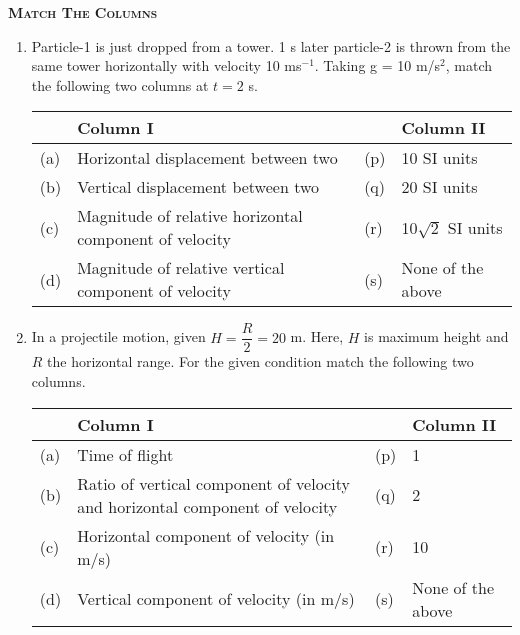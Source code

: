 \documentclass{article}
\renewcommand{\frac}[2]{\dfrac{#1}{#2}}
\begin{document}
\begin{center}
    \textsc{\textbf{Match The Columns}}
\end{center}


\begin{enumerate}
    \item Particle-1 is just dropped from a tower. 1 s later particle-2 is thrown from the same tower horizontally with velocity 10 ms$^{-1}$. Taking g = 10 m/s$^{2}$, match the following two columns at $t = 2$ s.
    \begin{center}
        \renewcommand{\arraystretch}{2}
        \begin{table}[h]
            \centering
            \begin{tabular}{p{0.25cm}p{8.5cm}|p{0.25cm}p{4.5cm}}
            \hline
            & Column I & & Column II \\
            \hline
            (a) & Horizontal displacement between two & (p) & 10 SI units \\
            (b) & Vertical displacement between two & (q) & 20 SI units \\
            (c) & Magnitude of relative horizontal component of velocity & (r) & 10$\sqrt{2}$ SI units \\
            (d) & Magnitude of relative vertical component of velocity & (s) & None of the above \\
            \hline
            \end{tabular}
        \end{table}
    \end{center}

    \item In a projectile motion, given $H = \frac{R}{2} = 20$ m. Here, $H$ is maximum height and $R$ the horizontal range. For the given condition match the following two columns.
    \begin{center}
        \renewcommand{\arraystretch}{2}
        \begin{table}[h]
            \centering
            \begin{tabular}{p{0.25cm}p{8.8cm}|p{0.25cm}p{4.5cm}}
            \hline
            & Column I & & Column II \\
            \hline
            (a) & Time of flight & (p) & 1 \\
            (b) & Ratio of vertical component of velocity and horizontal component of velocity & (q) & 2 \\
            (c) & Horizontal component of velocity (in m/s) & (r) & 10 \\
            (d) & Vertical component of velocity (in m/s) & (s) & None of the above \\
            \hline
            \end{tabular}
        \end{table}
    \end{center}


\end{enumerate}
\end{document}

